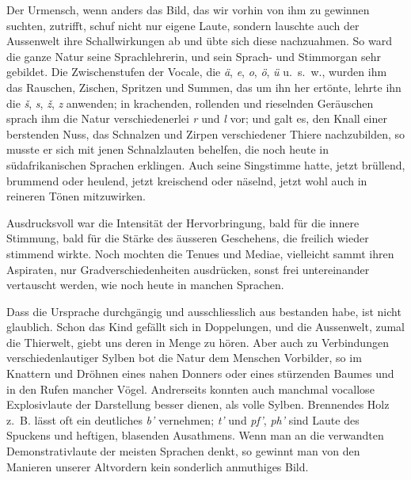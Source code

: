 Der Urmensch, wenn anders das Bild, das wir vorhin von ihm zu gewinnen suchten, zutrifft, schuf nicht nur eigene Laute, sondern lauschte auch der Aussenwelt ihre Schallwirkungen ab und übte sich diese nachzuahmen. So ward die \label{sp.314} ganze Natur seine Sprachlehrerin, und sein Sprach- und Stimmorgan sehr  gebildet. Die Zwischenstufen der Vocale, die \textit{ä}, \textit{e}, \textit{o}, \textit{ö}, \textit{ü} u.~s.~w., wurden ihm   das Rauschen, Zischen, Spritzen und Summen, das um ihn her ertönte, lehrte ihn die \textit{š}, \textit{s}, \textit{ž}, \textit{z} anwenden; in krachenden, rollenden und rieselnden Geräuschen sprach ihm die Natur verschiedenerlei \textit{r} und \textit{l} vor; und galt es, den Knall einer berstenden Nuss, das Schnalzen und Zirpen verschiedener Thiere nachzubilden, so musste er sich mit jenen Schnalzlauten behelfen, die noch heute in südafrikanischen Sprachen erklingen. Auch seine Singstimme hatte, jetzt brüllend, brummend oder heulend, jetzt kreischend oder näselnd, jetzt wohl auch in reineren Tönen mitzuwirken.

Ausdrucksvoll war die Intensität der Hervorbringung, bald für die innere Stimmung, bald für die Stärke des äusseren Geschehens, die freilich wieder stimmend wirkte. Noch mochten die Tenues und Mediae, vielleicht sammt ihren Aspiraten, nur Gradverschiedenheiten ausdrücken, sonst frei untereinander vertauscht werden, wie noch heute in manchen Sprachen.

Dass die Ursprache durchgängig und ausschliesslich aus  bestanden habe, ist nicht glaublich. Schon das Kind gefällt sich in Doppelungen, und die Aussenwelt, zumal die Thierwelt, giebt uns deren in Menge zu hören. Aber auch zu Verbindungen verschiedenlautiger Sylben bot die Natur dem Menschen Vorbilder, so im Knattern und Dröhnen eines nahen Donners oder eines stürzenden Baumes und in den Rufen mancher Vögel. Andrerseits konnten auch manchmal vocallose Explosivlaute der Darstellung besser dienen, als volle Sylben. Brennendes Holz z.~B. lässt oft ein deutliches \textit{b’} vernehmen; \textit{t’} und \textit{pf’}, \textit{ph’} sind Laute des Spuckens und heftigen, blasenden Ausathmens. Wenn man an die verwandten Demonstrativlaute der meisten Sprachen denkt, so gewinnt man von den Manieren unserer Altvordern kein sonderlich anmuthiges Bild.

